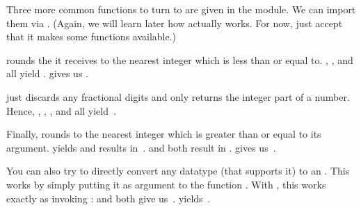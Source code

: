 Three more common functions to turn  to  are given in the  module.
We can import them via .
(Again, we will learn later how  actually works.
For now, just accept that it makes some functions available.)

 rounds the  it receives to the nearest integer which is less than or equal to.
, , and  all yield .
 gives us .

 just discards any fractional digits and only returns the integer part of a number.
Hence, , , , and  all yield~.

Finally,  rounds to the nearest integer which is greater than or equal to its argument.
 yields  and  results in~.
 and  both result in .
 gives us~.

You can also try to directly convert any datatype (that supports it) to an .
This works by simply putting it as argument to the function .
With , this works exactly as invoking :
 and  both give us~.
 yields~.

